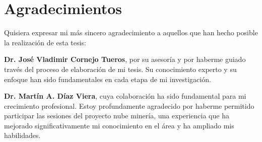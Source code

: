 \newpage
\section*{Agradecimientos}
Quisiera expresar mi más sincero agradecimiento a aquellos que han hecho posible la realización de esta tesis:

\textbf{Dr. José Vladimir Cornejo Tueros}, por su  asesoría  y por haberme guiado través del proceso de elaboración de mi tesis. Su conocimiento experto y su enfoque han sido fundamentales en cada etapa de mi investigación.

\textbf{Dr. Martín A. Díaz Viera}, cuya colaboración ha sido fundamental para mi crecimiento profesional. Estoy profundamente agradecido por haberme permitido participar las sesiones del proyecto nube minería, una experiencia que ha mejorado significativamente mi conocimiento en el área y ha ampliado mis habilidades.





